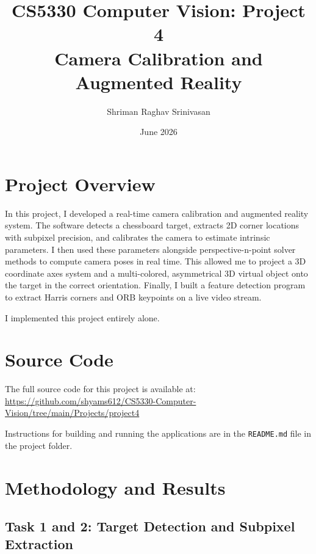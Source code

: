 \documentclass[11pt,letterpaper]{article}
\title{\textbf{CS5330 Computer Vision: Project 4}\\
       \large Camera Calibration and Augmented Reality}
\author{Shriman Raghav Srinivasan}
\date{June 2026}
\begin{document}
\maketitle

\section*{Project Overview}

In this project, I developed a real-time camera calibration and augmented reality system. The software detects a chessboard target, extracts 2D corner locations with subpixel precision, and calibrates the camera to estimate intrinsic parameters. I then used these parameters alongside perspective-n-point solver methods to compute camera poses in real time. This allowed me to project a 3D coordinate axes system and a multi-colored, asymmetrical 3D virtual object onto the target in the correct orientation. Finally, I built a feature detection program to extract Harris corners and ORB keypoints on a live video stream.

I implemented this project entirely alone.

\section*{Source Code}

The full source code for this project is available at:\\
\url{https://github.com/shyams612/CS5330-Computer-Vision/tree/main/Projects/project4}

Instructions for building and running the applications are in the \texttt{README.md} file in the project folder.

\section*{Methodology and Results}

\subsection*{Task 1 and 2: Target Detection and Subpixel Extraction}
\end{document}
